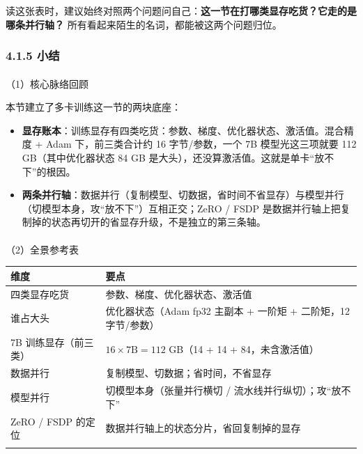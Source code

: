\documentclass[
  chinese,
]{ctexart}
\makeatletter
\let\oldparagraph\paragraph
\renewcommand{\paragraph}{
    \@ifstar
      \xxxParagraphStar
      \xxxParagraphNoStar
  }
\newcommand{\xxxParagraphStar}[1]{\oldparagraph*{#1}\mbox{}}
\newcommand{\xxxParagraphNoStar}[1]{\oldparagraph{#1}\mbox{}}
\providecommand{\tightlist}{%
  \setlength{\itemsep}{0pt}\setlength{\parskip}{0pt}}
\makeatother
\begin{document}
读这张表时，建议始终对照两个问题问自己：\textbf{这一节在打哪类显存吃货？它走的是哪条并行轴？}
所有看起来陌生的名词，都能被这两个问题归位。

\subsubsection{4.1.5 小结}\label{ux5c0fux7ed3}

\paragraph{（1）核心脉络回顾}\label{ux6838ux5fc3ux8109ux7edcux56deux987e}

本节建立了多卡训练这一节的两块底座：

\begin{itemize}
\tightlist
\item
  \textbf{显存账本}：训练显存有四类吃货：参数、梯度、优化器状态、激活值。混合精度
  + Adam 下，前三类合计约 16 字节/参数，一个 7B 模型光这三项就要 112
  GB（其中优化器状态 84 GB
  是大头），还没算激活值。这就是单卡``放不下''的根因。
\item
  \textbf{两条并行轴}：数据并行（复制模型、切数据，省时间不省显存）与模型并行（切模型本身，攻``放不下''）互相正交；ZeRO
  / FSDP
  是数据并行轴上把复制掉的状态再切开的省显存升级，不是独立的第三条轴。
\end{itemize}

\paragraph{（2）全景参考表}\label{ux5168ux666fux53c2ux8003ux8868}

\begin{center}
\begin{tabular}{@{}>{\raggedright\arraybackslash}p{} >{\raggedright\arraybackslash}p{}@{}}
\toprule\noalign{}
维度 & 要点 \\
\midrule\noalign{}
四类显存吃货 & 参数、梯度、优化器状态、激活值 \\
谁占大头 & 优化器状态（Adam fp32 主副本 + 一阶矩 + 二阶矩，12 字节/参数） \\
7B 训练显存（前三类） & \(16 \times 7\text{B} = 112\) GB（14 + 14 + 84，未含激活值） \\
数据并行 & 复制模型、切数据；省时间，不省显存 \\
模型并行 & 切模型本身（张量并行横切 / 流水线并行纵切）；攻``放不下'' \\
ZeRO / FSDP 的定位 & 数据并行轴上的状态分片，省回复制掉的显存 \\
\bottomrule\noalign{}
\end{tabular}
\end{center}
\end{document}
